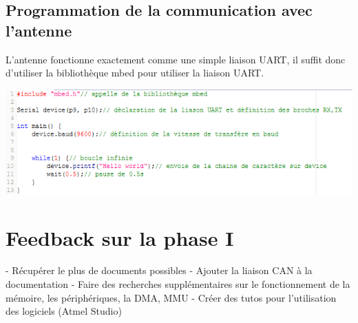 \documentclass[12pt, a4paper, openright]{report}
\begin{document}
\subsection{Programmation de la communication avec l’antenne}
L’antenne fonctionne exactement comme une simple liaison UART, il suffit donc d’utiliser la bibliothèque mbed pour utiliser la liaison UART.

\includegraphics[]{aaa.png}



\section{Feedback sur la phase I}
- Récupérer le plus de documents possibles
- Ajouter la liaison CAN à la documentation
- Faire des recherches supplémentaires sur le fonctionnement de la mémoire, les périphériques, la DMA, MMU
- Créer des tutos pour l'utilisation des logiciels (Atmel Studio)
	
	\clearpage
	\pagestyle{plain}    %
	
	
	
	
\end{document}
